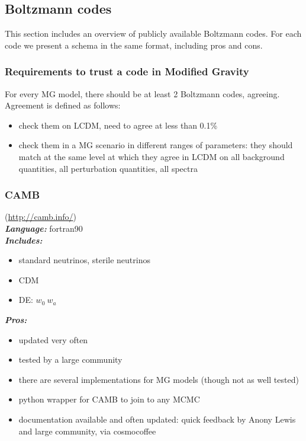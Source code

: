 \newpage
\subsection{Boltzmann codes}
This section includes an overview of publicly available Boltzmann codes. For each code we present a schema in the same format, including pros and cons.

\subsubsection{Requirements to trust a code in Modified Gravity}

For every MG model, there should be at least 2 Boltzmann codes, agreeing. Agreement is defined as follows: 
\begin{itemize}
 \item check them on LCDM, need to agree at less than 0.1\%
 \item check them in a MG scenario in different ranges of parameters: they should match at the same level at which they agree in LCDM on 
all background quantities, all perturbation quantities, all spectra
\end{itemize}

\newpage
\subsubsection{CAMB}
(\url{http://camb.info/})\\

{\it \bf Language:} fortran90\\

{\it \bf Includes:}
\begin{itemize}
 \item standard neutrinos, sterile neutrinos
 \item CDM
 \item DE: $w_0\ w_a$
\end{itemize}

{\it \bf Pros: }
\begin{itemize}
 \item updated very often
 \item tested by a large community
 \item there are several implementations for MG models (though not as well tested)
 \item python wrapper for CAMB to join to any MCMC
 \item documentation available and often updated: quick feedback by Anony Lewis and large community, via cosmocoffee
\end{itemize}

